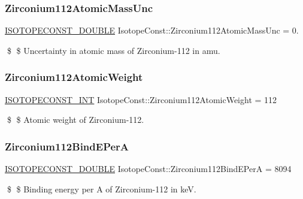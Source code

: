 \subsubsection{\texorpdfstring{Zirconium112\+Atomic\+Mass\+Unc}{Zirconium112AtomicMassUnc}}
{\footnotesize\ttfamily \mbox{\hyperlink{group___isotope_const-_macros_ga8f45a7272ce02c0b4c65c44636ed719a}{I\+S\+O\+T\+O\+P\+E\+C\+O\+N\+S\+T\+\_\+\+D\+O\+U\+B\+LE}} Isotope\+Const\+::\+Zirconium112\+Atomic\+Mass\+Unc = 0.}

\$ \$ Uncertainty in atomic mass of Zirconium-\/112 in amu. \mbox{\label{group___isotope_const-_zirconium-_zr112_ga2e64bb3e9a5f39e66849f83c01784b4f}} 
\subsubsection{\texorpdfstring{Zirconium112\+Atomic\+Weight}{Zirconium112AtomicWeight}}
{\footnotesize\ttfamily \mbox{\hyperlink{group___isotope_const-_macros_ga5f18360b3e99483a35c32d789e62621c}{I\+S\+O\+T\+O\+P\+E\+C\+O\+N\+S\+T\+\_\+\+I\+NT}} Isotope\+Const\+::\+Zirconium112\+Atomic\+Weight = 112}

\$ \$ Atomic weight of Zirconium-\/112. \mbox{\label{group___isotope_const-_zirconium-_zr112_ga69f082b73e8369b8a2fb0b5a51cfe5fb}} 
\subsubsection{\texorpdfstring{Zirconium112\+Bind\+E\+PerA}{Zirconium112BindEPerA}}
{\footnotesize\ttfamily \mbox{\hyperlink{group___isotope_const-_macros_ga8f45a7272ce02c0b4c65c44636ed719a}{I\+S\+O\+T\+O\+P\+E\+C\+O\+N\+S\+T\+\_\+\+D\+O\+U\+B\+LE}} Isotope\+Const\+::\+Zirconium112\+Bind\+E\+PerA = 8094}

\$ \$ Binding energy per A of Zirconium-\/112 in keV. \mbox{\label{group___isotope_const-_zirconium-_zr112_ga9e2c6525edfd34d4c383888317cf1ae4}} 
